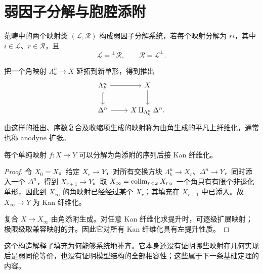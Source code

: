 \section{弱因子分解与胞腔添附}
\begin{definition}[弱因子分解系统]
范畴中的两个映射类 $(\mathcal L,\mathcal R)$ 构成弱因子分解系统，若每个映射分解为 $ri$，其中 $i\in\mathcal L$、$r\in\mathcal R$，且
\[
\mathcal L={}^\perp\mathcal R,
\qquad \mathcal R=\mathcal L^\perp.
\]
\end{definition}
\begin{definition}[角添附]
把一个角映射 $\Lambda_k^n\to X$ 延拓到新单形，得到推出
\[
\begin{tikzcd}
\Lambda_k^n\ar[r]\ar[d,hook]&X\ar[d]\\
\Delta^n\ar[r]&X\amalg_{\Lambda_k^n}\Delta^n.
\end{tikzcd}
\]
由这样的推出、序数复合及收缩项生成的映射称为由角生成的平凡上纤维化，通常也称 anodyne 扩张。
\end{definition}
\begin{proposition}[添附填充的因子分解]
每个单纯映射 $f:X\to Y$ 可以分解为角添附的序列后接 Kan 纤维化。
\end{proposition}
\begin{proof}
令 $X_0=X$。给定 $X_r\to Y$，对所有交换方块 $\Lambda_k^n\to X_r$、$\Delta^n\to Y$，同时添入一个 $\Delta^n$，得到 $X_{r+1}\to Y$。取 $X_\infty=\operatorname*{colim}_{r<\omega}X_r$。一个角只有有限个非退化单形，因此到 $X_\infty$ 的角映射已经经过某个 $X_r$；其填充在 $X_{r+1}$ 中已添入。故 $X_\infty\to Y$ 为 Kan 纤维化。

复合 $X\to X_\infty$ 由角添附生成。对任意 Kan 纤维化求提升时，可逐级扩展映射；极限级取兼容映射的并。因此它对所有 Kan 纤维化具有左提升性质。
\end{proof}
\begin{remark}
这个构造解释了填充为何能够系统地补齐。它本身还没有证明哪些映射在几何实现后是弱同伦等价，也没有证明模型结构的全部相容性；这些属于下一条基础定理的内容。
\end{remark}

